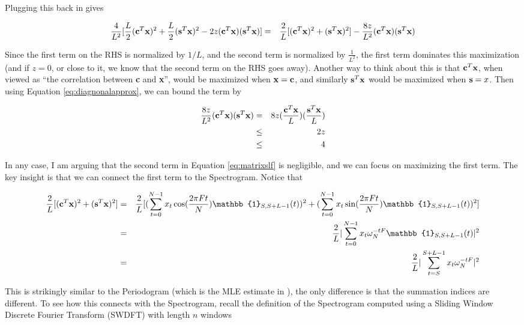 \documentclass[11pt]{article}
\theoremstyle{plain}
\theoremstyle{definition}
\begin{document}
\noindent Plugging this back in gives 

\begin{eqnarray}
\label{eq:matrixslf}
	\frac{4}{L^2}[\frac{L}{2} ({\bf c}^T {\bf x})^2 + \frac{L}{2} ({\bf s}^T {\bf x})^2 - 2 z ({\bf c}^T {\bf x}) ({\bf s}^T {\bf x})] &=& \frac{2}{L}[({\bf c}^T {\bf x})^2 + ({\bf s}^T {\bf x})^2] - \frac{8z}{L^2} ({\bf c}^T {\bf x}) ({\bf s}^T {\bf x}) \nonumber 
\end{eqnarray}

\noindent Since the first term on the RHS is normalized by $1/L$, and the second term is normalized by $\frac{1}{L^2}$, the first term dominates this maximization (and if $z = 0$, or close to it, we know that the second term on the RHS goes away). Another way to think about this is that ${\bf c}^T {\bf x}$, when viewed as ``the correlation between {\bf c} and {\bf x}'', would be maximized when ${\bf x} = {\bf c}$, and similarly ${\bf s}^T {\bf x}$ would be maximized when ${\bf s} = x$. Then using Equation \ref{eq:diagnonalapprox}, we can bound the term by

\begin{eqnarray}
\label{eq:diagbound}
	\frac{8z}{L^2} ({\bf c}^T {\bf x}) ({\bf s}^T {\bf x}) &=& 8z (\frac{{\bf c}^T {\bf x}}{L}) (\frac{{\bf s}^T {\bf x}}{L}) \nonumber \\
	&\leq& 2z \nonumber \\
	&\leq& 4
\end{eqnarray}

In any case, I am arguing that the second term in Equation \ref{eq:matrixslf} is negligible, and we can focus on maximizing the first term. The key insight is that we can connect the first term to the Spectrogram. Notice that

\begin{eqnarray}
\label{eq:maxslfspec}
	\frac{2}{L} [ ({\bf c}^T {\bf x})^2 + ({\bf s}^T {\bf x})^2] &=& \frac{2}{L} [ (\sum_{t=0}^{N-1} x_t \cos(\frac{2 \pi F t}{N}) \mathbb{1}_{S,S+L-1}(t))^2 + (\sum_{t=0}^{N-1} x_t \sin(\frac{2 \pi F t}{N}) \mathbb{1}_{S,S+L-1}(t))^2]  \nonumber \\
	&=& \frac{2}{L} |\sum_{t=0}^{N-1} x_t \omega_N^{-tF} \mathbb{1}_{S,S+L-1}(t)|^2 \nonumber \\
	&=& \frac{2}{L} |\sum_{t=S}^{S+L-1} x_t \omega_N^{-tF}|^2
\end{eqnarray}

This is strikingly similar to the Periodogram (which is the MLE estimate in \cite{kay1993fundamentals}), the only difference is that the summation indices are different. To see how this connects with the Spectrogram, recall the definition of the Spectrogram computed using a Sliding Window Discrete Fourier Transform (SWDFT) with length $n$ windows
\end{document}
